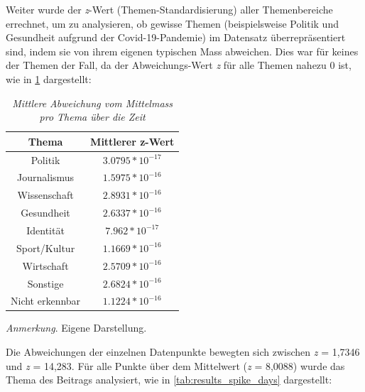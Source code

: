 \documentclass[12pt,a4paper]{article}        %
\begin{document}
Weiter wurde der \textit{z}-Wert (Themen-Standardisierung) aller Themenbereiche errechnet, um zu analysieren, ob gewisse Themen (beispielsweise Politik und Gesundheit aufgrund der Covid-19-Pandemie) im Datensatz überrepräsentiert sind, indem sie von ihrem eigenen typischen Mass abweichen. Dies war für keines der Themen der Fall, da der Abweichungs-Wert \textit{z} für alle Themen nahezu 0 ist, wie in \ref{tab:results_date_dependency_topic_deviation} dargestellt:
\begin{table}[H]
  \caption{\textit{Mittlere Abweichung vom Mittelmass pro Thema über die Zeit}}
  \label{tab:results_date_dependency_topic_deviation}
  \centering
  \begin{tabular}{|c|c|} \hline
    \textbf{Thema}&  \textbf{Mittlerer z-Wert}\\ \hline
    Politik&  \(3.0795*10^{-17}\)\\ \hline
    Journalismus&  \(1.5975*10^{-16}\)\\ \hline
    Wissenschaft&  \(2.8931*10^{-16}\)\\ \hline
    Gesundheit&  \(2.6337*10^{-16}\)\\ \hline
    Identität&  \(7.962*10^{-17}\)\\ \hline
    Sport/Kultur&  \(1.1669*10^{-16}\)\\ \hline
    Wirtschaft&  \(2.5709*10^{-16}\)\\ \hline
    Sonstige&  \(2.6824*10^{-16}\)\\ \hline
    Nicht erkennbar& \(1.1224*10^{-16}\)\\ \hline
  \end{tabular}
\footnotesize\textit{Anmerkung}. Eigene Darstellung.
\end{table}
Die Abweichungen der einzelnen Datenpunkte bewegten sich zwischen \textit{z} = 1,7346 und \textit{z} = 14,283. Für alle Punkte über dem Mittelwert (\textit{z} = 8,0088) wurde das Thema des Beitrags analysiert, wie in \ref{tab:results_spike_days} dargestellt:
\end{document}
